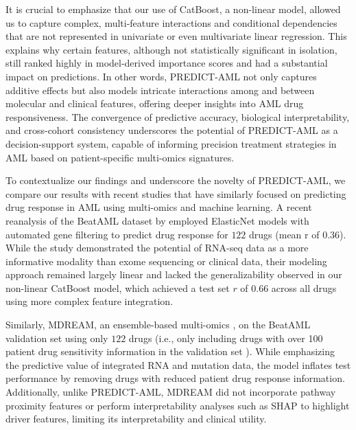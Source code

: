 \documentclass[pdflatex,sn-mathphys-num]{sn-jnl}%
\theoremstyle{thmstyleone}%
\theoremstyle{thmstyletwo}%
\theoremstyle{thmstylethree}%
\begin{document}
It is crucial to emphasize that our use of CatBoost, a non-linear model, allowed us to capture complex, multi-feature interactions and conditional dependencies that are not represented in univariate or even multivariate linear regression. 
This explains why certain features, although not statistically significant in isolation, still ranked highly in model-derived importance scores and had a substantial impact on predictions. 
In other words, PREDICT-AML not only captures additive effects but also models intricate interactions among and between molecular and clinical features, offering deeper insights into AML drug responsiveness. The convergence of predictive accuracy, biological interpretability, and cross-cohort consistency underscores the potential of PREDICT-AML as a decision-support system, capable of informing precision treatment strategies in AML based on patient-specific multi-omics signatures.

To contextualize our findings and underscore the novelty of PREDICT-AML, we compare our results with recent studies that have similarly focused on predicting drug response in AML using multi-omics and machine learning. A recent reanalysis of the BeatAML dataset by \cite{karathanasis2024machine} employed ElasticNet models with automated gene filtering to predict drug response for $122$ drugs (mean r of $0.36$). While the study demonstrated the potential of RNA-seq data as a more informative modality than exome sequencing or clinical data, their modeling approach remained largely linear and lacked the generalizability observed in our non-linear CatBoost model, which achieved a test set $r$ of 0.66 across all drugs using more complex feature integration.

Similarly, MDREAM, an ensemble-based multi-omics \cite{trac2023prediction}, on the BeatAML validation set using only $122$ drugs (i.e., only including drugs with over 100 patient drug sensitivity information in the validation set \cite{trac2023prediction}). While emphasizing the predictive value of integrated RNA and mutation data, the model inflates test performance by removing drugs with reduced patient drug response information. Additionally, unlike PREDICT-AML, MDREAM did not incorporate pathway proximity features or perform interpretability analyses such as SHAP to highlight driver features, limiting its interpretability and clinical utility.
\end{document}
